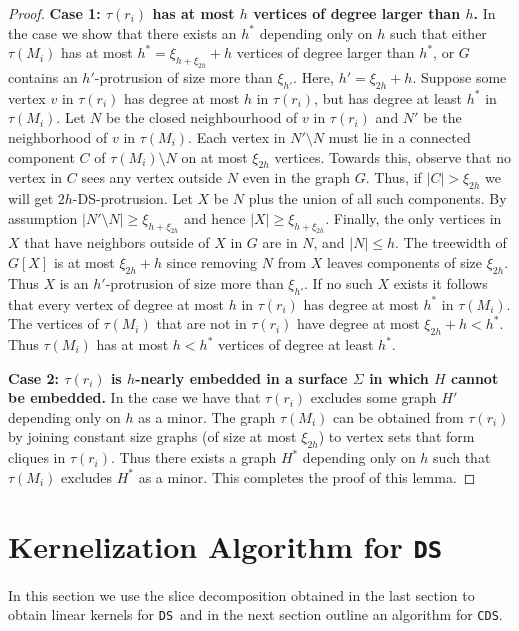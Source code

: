 \documentclass[11pt]{article}
\newcommand{\tDS}{{\texttt{\sc DS}}}
\newcommand{\tCDS}{{\texttt{\sc CDS}}}
\begin{document}
\begin{proof}
 \noindent 
 {\bf Case 1:  $\tau(r_i)$  has at most $h$ vertices of degree larger than $h$.} 
In the case 
we show that there exists an $h^*$ depending only on $h$ such that either $\tau(M_i)$ has at most $h^* = \xi_{h+\xi_{2h}}+h$ vertices of degree larger than $h^*$,  or $G$ contains an $h'$-protrusion of size more than $\xi_{h'}$. Here, $h'=\xi_{2h}+h$. Suppose some vertex $v$ in $\tau(r_i)$ has degree at most $h$ in  $\tau(r_i)$, but has degree at least $h^*$ in $\tau(M_i)$. Let $N$ be the closed neighbourhood of $v$ in $\tau(r_i)$ and $N'$ be the neighborhood of $v$ in $\tau(M_i)$. 
Each vertex in $N' \setminus N$ must lie in a connected component $C$ of $\tau(M_i) \setminus N$ on at most $\xi_{2h}$ vertices. Towards this, observe that no vertex in $C$ sees any vertex outside $N$ even in the graph $G$.  Thus, if $|C|> \xi_{2h}$ we will get  $2h$-{\sc DS}-protrusion. Let $X$ be $N$ plus the union of all such components. By assumption $|N' \setminus N| \geq  \xi_{h+\xi_{2h}}$ and hence $|X| \geq \xi_{h+\xi_{2h}}$. Finally, the only vertices in $X$ that have neighbors outside of $X$ in $G$ are in $N$, and $|N| \leq h$. The treewidth of $G[X]$ is at most $\xi_{2h}+h$ since removing $N$ from $X$ leaves components of size $\xi_{2h}$. Thus $X$ is an $h'$-protrusion of size more than $\xi_{h'}$. If no such $X$ exists it follows that every vertex of degree at most $h$ in $\tau(r_i)$ has degree at most $h^*$ in $\tau(M_i)$. The vertices of  $\tau(M_i)$ that are not in $\tau(r_i)$ have degree at most $\xi_{2h}+h < h^*$. Thus  $\tau(M_i)$  has at most $h < h^*$ vertices of degree at least $h^*$.

\medskip
 \noindent 
 {\bf Case 2:  $\tau(r_i)$  is $h$-nearly embedded in a surface $\Sigma$ in which $H$ cannot be embedded.} 
In the case  we have that $\tau(r_i)$ excludes some graph $H'$ depending only on $h$ as a minor. The graph $\tau(M_i)$ can be obtained from  $\tau(r_i)$ by joining constant size graphs (of size at most $\xi_{2h}$) to vertex sets that form cliques in $\tau(r_i)$. Thus there exists a graph $H^*$ depending only on $h$ such that $\tau(M_i)$ excludes $H^*$ as a minor. This completes the proof of this lemma. 
\end{proof}








\section{Kernelization Algorithm for \tDS}
\label{sec:domset_kernel}
In this section we use the slice decomposition obtained in the last section 
to obtain linear kernels for  \tDS \ and in the next section outline an algorithm for \tCDS.
\end{document}
